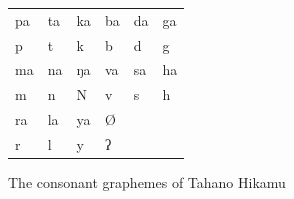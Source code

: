 \begin{figure}
\caption{The consonant graphemes of Tahano Hikamu}

\begin{tabu} to \linewidth{X X X X X X}
\toprule
\tableheaderfont	pa & ta & ka & ba & da & ga \\
\rowfont{\Tagati}	p & t & k & b & d & g \\

\midrule

\tableheaderfont	ma & na & ŋa & va & sa & ha \\
\rowfont{\Tagati}	m & n & N & v & s & h \\

\midrule

\tableheaderfont	ra & la & ya & Ø \\
\rowfont{\Tagati}	r & l & y & ʔ \\

\bottomrule
\end{tabu}
\label{fig:thcons}
\end{figure}

